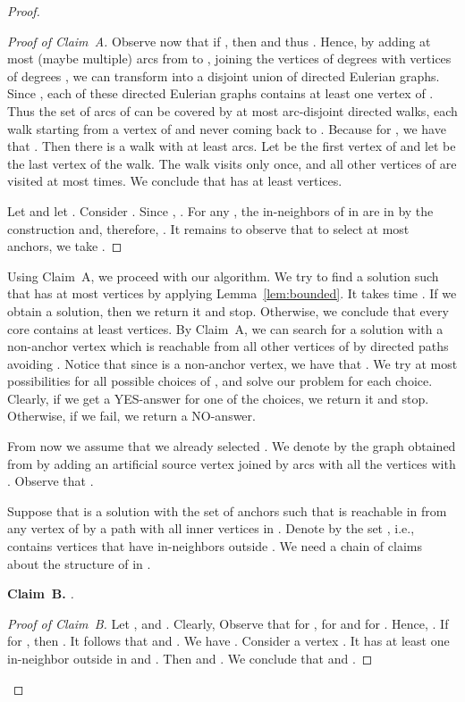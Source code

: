 \documentclass[11pt,a4paper]{article}
\begin{document}
\begin{proof}
\begin{proof}[Proof of Claim~A]
Observe now that if , then  and thus . Hence, by adding at most 
(maybe multiple) arcs from  to , joining the vertices  of degrees  with
vertices of degrees  , we  can  transform  into a disjoint union of  directed Eulerian graphs.
Since , each of these directed Eulerian graphs contains at least one vertex of . Thus  the set of arcs
of  can be covered by at most  arc-disjoint directed walks,   each walk starting from a vertex of  and never
coming back to . Because  for , we have that . Then there is a walk  with at least  arcs.  Let  be the first vertex of  and let  be the last
vertex of the walk. The walk  visits  only once,   and all other vertices of  are visited at most  times. We
conclude  that  has at least  vertices.

Let  and let . Consider . Since
, .  For any , the in-neighbors of  in  are in  by the
construction and, therefore, . It remains to observe that to select at most  anchors, we take .
\end{proof}

Using  Claim~A, we proceed with our algorithm. We try to find a solution such that  has at most  vertices by applying  Lemma~\ref{lem:bounded}. It takes time . If we obtain a
solution, then we return it and stop. Otherwise, we conclude that every core  contains at least 
vertices. By Claim~A, we can search for a solution    with a  non-anchor vertex  which is reachable from
all other vertices of  by directed paths  avoiding . Notice that since  is a non-anchor vertex, we have that
. We try  at most  possibilities for all possible choices of  , and solve our problem for each choice.
Clearly, if we get a YES-answer for one of the choices, we return it and stop. Otherwise, if we fail,  we return a NO-answer.

From now we assume that we already selected . We denote by  the graph obtained from  by adding  an artificial source
vertex  joined by arcs with all the vertices  with . Observe that .

\medskip

Suppose that  is a solution with the set of anchors  such that  is reachable in  from any
vertex of  by a path with all inner vertices in . Denote by  the set , i.e.,  contains vertices that have in-neighbors outside . We
need a chain of claims about the structure of  in .


\medskip
\noindent
{\bf Claim~B.} {\it
.
}


\begin{proof}[Proof of Claim~B]
Let ,  and . Clearly,  Observe that  for ,   for  and
 for . Hence, . If  for , then . It
follows that  and . We have . Consider a vertex .
It has at least one in-neighbor outside  in  and . Then  and  . We conclude that
 and .
\end{proof}



\end{proof}
\end{document}

